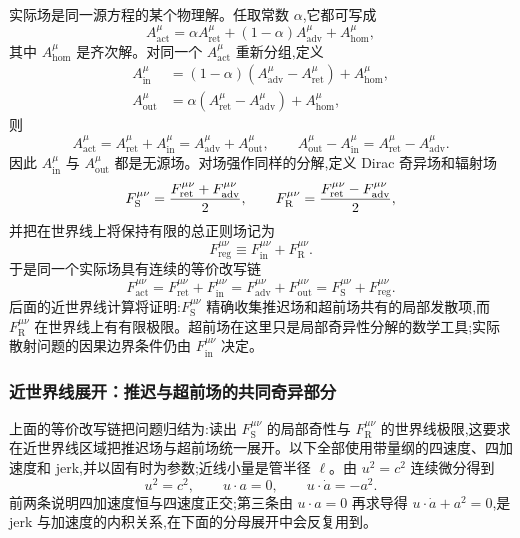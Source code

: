 实际场是同一源方程的某个物理解。任取常数 $\alpha$,它都可写成
\begin{equation*}
 A_{\mathrm{act}}^\mu
 =\alpha A_{\mathrm{ret}}^\mu
 +(1-\alpha)A_{\mathrm{adv}}^\mu
 +A_{\mathrm{hom}}^\mu,
\end{equation*}
其中 $A_{\mathrm{hom}}^\mu$ 是齐次解。对同一个 $A_{\mathrm{act}}^\mu$ 重新分组,定义
\begin{align*}
 A_{\mathrm{in}}^\mu
 &=(1-\alpha)(A_{\mathrm{adv}}^\mu-A_{\mathrm{ret}}^\mu)
 +A_{\mathrm{hom}}^\mu,\\
 A_{\mathrm{out}}^\mu
 &=\alpha(A_{\mathrm{ret}}^\mu-A_{\mathrm{adv}}^\mu)
 +A_{\mathrm{hom}}^\mu,
\end{align*}
则
\begin{equation*}
 A_{\mathrm{act}}^\mu
 =A_{\mathrm{ret}}^\mu+A_{\mathrm{in}}^\mu
 =A_{\mathrm{adv}}^\mu+A_{\mathrm{out}}^\mu,
 \qquad
 A_{\mathrm{out}}^\mu-A_{\mathrm{in}}^\mu
 =A_{\mathrm{ret}}^\mu-A_{\mathrm{adv}}^\mu.
\end{equation*}
因此 $A_{\mathrm{in}}^\mu$ 与 $A_{\mathrm{out}}^\mu$ 都是无源场。对场强作同样的分解,定义 Dirac 奇异场和辐射场
\begin{equation*}
 F_{\mathrm S}^{\mu\nu}
 ={F_{\mathrm{ret}}^{\mu\nu}+F_{\mathrm{adv}}^{\mu\nu}\over2},
 \qquad
 F_{\mathrm R}^{\mu\nu}
 ={F_{\mathrm{ret}}^{\mu\nu}-F_{\mathrm{adv}}^{\mu\nu}\over2},
\end{equation*}
并把在世界线上将保持有限的总正则场记为
\begin{equation*}
 F_{\mathrm{reg}}^{\mu\nu}
 \equiv F_{\mathrm{in}}^{\mu\nu}+F_{\mathrm R}^{\mu\nu}.
\end{equation*}
于是同一个实际场具有连续的等价改写链
\begin{equation*}
 F_{\mathrm{act}}^{\mu\nu}
 =F_{\mathrm{ret}}^{\mu\nu}+F_{\mathrm{in}}^{\mu\nu}
 =F_{\mathrm{adv}}^{\mu\nu}+F_{\mathrm{out}}^{\mu\nu}
 =F_{\mathrm S}^{\mu\nu}+F_{\mathrm{reg}}^{\mu\nu}.
\end{equation*}
后面的近世界线计算将证明:$F_{\mathrm S}^{\mu\nu}$ 精确收集推迟场和超前场共有的局部发散项,而 $F_{\mathrm R}^{\mu\nu}$ 在世界线上有有限极限。超前场在这里只是局部奇异性分解的数学工具;实际散射问题的因果边界条件仍由 $F_{\mathrm{in}}^{\mu\nu}$ 决定。

\subsubsection{近世界线展开：推迟与超前场的共同奇异部分}

上面的等价改写链把问题归结为:读出 $F_{\mathrm S}^{\mu\nu}$ 的局部奇性与 $F_{\mathrm R}^{\mu\nu}$ 的世界线极限,这要求在近世界线区域把推迟场与超前场统一展开。以下全部使用带量纲的四速度、四加速度和 jerk,并以固有时为参数;近线小量是管半径 $\ell$。由 $u^2=c^2$ 连续微分得到
\begin{equation*}
 u^2=c^2,
 \qquad
 u\cdot a=0,
 \qquad
 u\cdot\dot a=-a^2.
\end{equation*}
前两条说明四加速度恒与四速度正交;第三条由 $u\cdot a=0$ 再求导得 $u\cdot\dot a+a^2=0$,是 jerk 与加速度的内积关系,在下面的分母展开中会反复用到。

